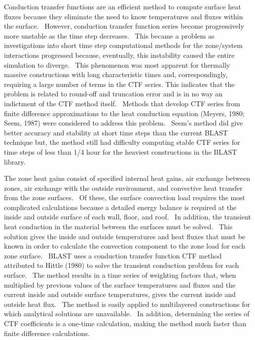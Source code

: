 Conduction transfer functions are an efficient method to compute surface heat fluxes because they eliminate the need to know temperatures and fluxes within the surface.~ However, conduction transfer function series become progressively more unstable as the time step decreases.~ This became a problem as investigations into short time step computational methods for the zone/system interactions progressed because, eventually, this instability caused the entire simulation to diverge.~ This phenomenon was most apparent for thermally massive constructions with long characteristic times and, correspondingly, requiring a large number of terms in the CTF series. This indicates that the problem is related to round-off and truncation error and is in no way an indictment of the CTF method itself.~ Methods that develop CTF series from finite difference approximations to the heat conduction equation (Meyers, 1980; Seem, 1987) were considered to address this problem.~ Seem's method did give better accuracy and stability at short time steps than the current BLAST technique but, the method still had difficulty computing stable CTF series for time steps of less than 1/4 hour for the heaviest constructions in the BLAST library.

The zone heat gains consist of specified internal heat gains, air exchange between zones, air exchange with the outside environment, and convective heat transfer from the zone surfaces.~ Of these, the surface convection load requires the most complicated calculations because a detailed energy balance is required at the inside and outside surface of each wall, floor, and roof.~ In addition, the transient heat conduction in the material between the surfaces must be solved.~ This solution gives the inside and outside temperatures and heat fluxes that must be known in order to calculate the convection component to the zone load for each zone surface.~ BLAST uses a conduction transfer function CTF method attributed to Hittle (1980) to solve the transient conduction problem for each surface.~ The method results in a time series of weighting factors that, when multiplied by previous values of the surface temperatures and fluxes and the current inside and outside surface temperatures, gives the current inside and outside heat flux.~ The method is easily applied to multilayered constructions for which analytical solutions are unavailable.~ In addition, determining the series of CTF coefficients is a one-time calculation, making the method much faster than finite difference calculations.

